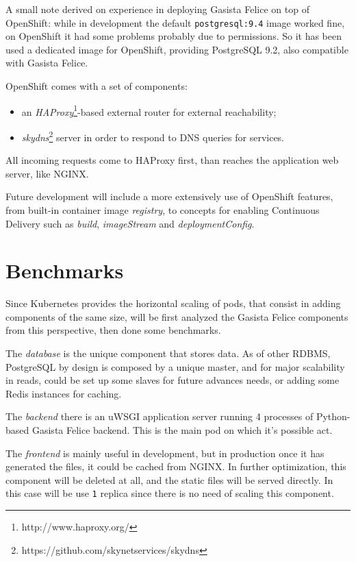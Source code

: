 A small note derived on experience in deploying Gasista Felice on top of OpenShift:  while in development the default \texttt{postgresql:9.4} image worked fine, on OpenShift it had some problems probably due to permissions. So it has been used a dedicated image for OpenShift, providing PostgreSQL 9.2, also compatible with Gasista Felice.

OpenShift comes with a set of components:

\begin{itemize}
\item an \textit{HAProxy}\footnote{http://www.haproxy.org/}-based external router for external reachability;
\item \textit{skydns}\footnote{https://github.com/skynetservices/skydns} server in order to respond to DNS queries for services.
\end{itemize}

All incoming requests come to HAProxy first, than reaches the application web server, like NGINX.

Future development will include a more extensively use of OpenShift features, from built-in container image \textit{registry}, to concepts for enabling Continuous Delivery such as \textit{build}, \textit{imageStream} and \textit{deploymentConfig}.

\section{Benchmarks}\label{benchmarks}

Since Kubernetes provides the horizontal scaling of pods, that consist in adding components of the same size, will be first analyzed the Gasista Felice components from this perspective, then done some benchmarks.

The \textit{database} is the unique component that stores data.  As of other RDBMS, PostgreSQL by design is composed by a unique master, and for major scalability in reads, could be set up some slaves for future advances needs, or adding some Redis instances for caching.

The \textit{backend} there is an uWSGI application server running 4 processes of Python-based Gasista Felice backend.  This is the main pod on which it's possible act.

The \textit{frontend} is mainly useful in development, but in production once it has generated the files, it could be cached from NGINX. In further optimization, this component will be deleted at all, and the static files will be served directly. In this case will be use \texttt{1} replica since there is no need of scaling this component.

